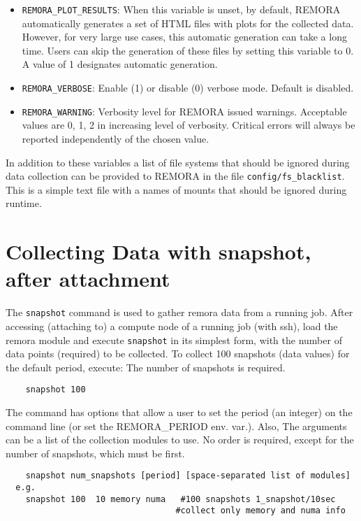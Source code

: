 \documentclass[10pt,a4paper]{report}
\begin{document}
{\begin{itemize}
    \item \texttt{REMORA\_PLOT\_RESULTS}: When this variable is unset, by default, REMORA automatically generates a set of HTML files with plots for the collected data. However, for very large use cases, this automatic generation can take a long time. Users can skip the generation of these files by setting this variable to 0. A value of 1 designates automatic generation.

	\item \texttt{REMORA\_VERBOSE}: Enable (1) or disable (0) verbose mode. Default is disabled.
	
	\item \texttt{REMORA\_WARNING}: Verbosity level for REMORA issued warnings. Acceptable values are 0, 1, 2 in increasing level of verbosity. Critical errors will always be reported independently of the chosen value.
\end{itemize}
}

In addition to these variables a list of file systems that should be ignored during data collection can be provided to REMORA in the file \verb+config/fs_blacklist+. This is a simple text file with a names of mounts that should be ignored during runtime.

\section{Collecting Data with snapshot, after attachment}

The \verb+snapshot+ command is used to gather remora data from a running job.
After accessing (attaching to) a compute node of a running job (with ssh), load the remora module
and execute \verb+snapshot+ in its simplest form, with the number of data points (required) 
to be collected. To collect 100 snapshots (data values) for the default period, execute:
The number of snapshots is required.

\begin{verbatim}
	snapshot 100
\end{verbatim}

The command has options that allow a user to set the period (an integer) on the
command line (or set the REMORA\_PERIOD env. var.).  Also, The arguments
can be a list of the collection modules to use. No order is required, except
for the number of snapshots, which must be first.

\begin{verbatim}
	snapshot num_snapshots [period] [space-separated list of modules]
  e.g.
	snapshot 100  10 memory numa   #100 snapshots 1_snapshot/10sec 
                                  #collect only memory and numa info
\end{verbatim}
\end{document}
